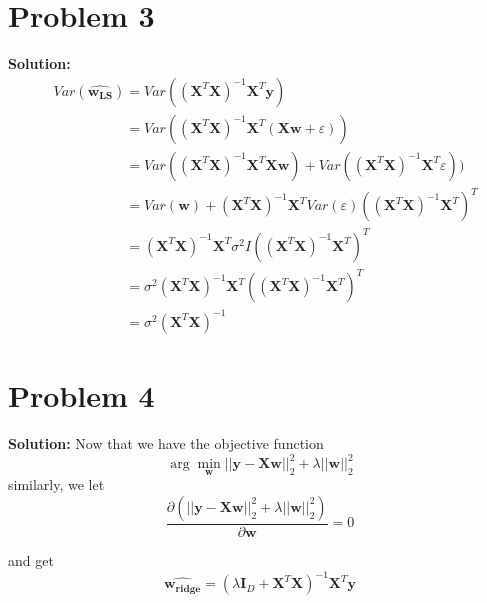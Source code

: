 \documentclass[11pt]{article}
\begin{document}
\section*{Problem 3}
\textbf{Solution:} 
\begin{align}
	&Var(\hat{\mathbf{w_{LS}}}) = Var((\mathbf{X}^T\mathbf{X})^{-1}\mathbf{X}^T\mathbf{y})\nonumber\\
	&\phantom{Var(\hat{\mathbf{w_{LS}}})} = Var((\mathbf{X}^T\mathbf{X})^{-1}\mathbf{X}^T(\mathbf{Xw} + \varepsilon))\nonumber\\
	&\phantom{Var(\hat{\mathbf{w_{LS}}})} = Var((\mathbf{X}^T\mathbf{X})^{-1}\mathbf{X}^T\mathbf{Xw}) + Var((\mathbf{X}^T\mathbf{X})^{-1}\mathbf{X}^T\varepsilon))\nonumber\\
	&\phantom{Var(\hat{\mathbf{w_{LS}}})} = Var(\mathbf{w}) + (\mathbf{X}^T\mathbf{X})^{-1}\mathbf{X}^TVar(\varepsilon)((\mathbf{X}^T\mathbf{X})^{-1}\mathbf{X}^T)^T\nonumber\\
	&\phantom{Var(\hat{\mathbf{w_{LS}}})} = (\mathbf{X}^T\mathbf{X})^{-1}\mathbf{X}^T\sigma^2I((\mathbf{X}^T\mathbf{X})^{-1}\mathbf{X}^T)^T\nonumber\\
	&\phantom{Var(\hat{\mathbf{w_{LS}}})} = \sigma^2(\mathbf{X}^T\mathbf{X})^{-1}\mathbf{X}^T((\mathbf{X}^T\mathbf{X})^{-1}\mathbf{X}^T)^T\nonumber\\
	&\phantom{Var(\hat{\mathbf{w_{LS}}})} = \sigma^2(\mathbf{X}^T\mathbf{X})^{-1}\nonumber
\end{align}
\section*{Problem 4}
\textbf{Solution:} Now that we have the objective function
\[\arg\min_{\mathbf{w}} ||\mathbf{y} - \mathbf{Xw}||^2_2+ \lambda||\mathbf{w}||^2_2 \]
similarly, we let
\[\frac{\partial (||\mathbf{y} - \mathbf{Xw}||^2_2 + \lambda||\mathbf{w}||^2_2)}{\partial\mathbf{w}} = 0\]

and get
\[\hat{\mathbf{w_{\text{ridge}}}} =  ( \lambda \mathbf{I}_D + \mathbf{X}^T\mathbf{X})^{-1}\mathbf{X}^T\mathbf{y}\]
\end{document}
